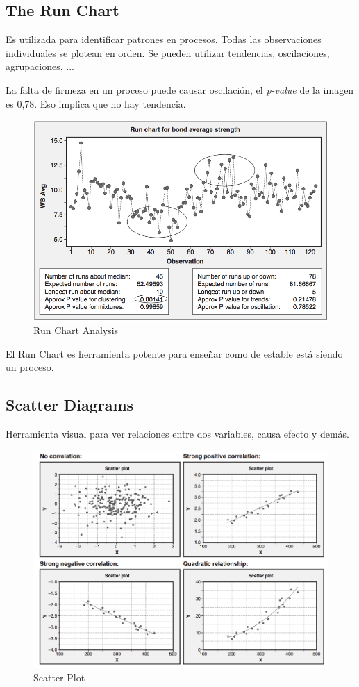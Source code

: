\documentclass[oneside]{book}
\begin{document}
\subsection{The Run Chart}

Es utilizada para identificar patrones en procesos. Todas las observaciones individuales se plotean en orden. Se pueden utilizar tendencias, oscilaciones, agrupaciones, ... 

La falta de firmeza en un proceso puede causar oscilación, el \textit{p-value} de la imagen es 0,78. Eso implica que no hay tendencia.

\begin{figure}[H]
	\centering
	\includegraphics[width=120mm]{imagenes/Run-Chart-Analysis.png}
	\caption{Run Chart Analysis}
	\label{fig:Run-Chart-Analysis}
\end{figure}

El Run Chart es herramienta potente para enseñar como de estable está siendo un proceso.

\subsection{Scatter Diagrams}

Herramienta visual para ver relaciones entre dos variables, causa efecto y demás. 

\begin{figure}[H]
	\centering
	\includegraphics[width=120mm]{imagenes/ScatterPlot.png}
	\caption{Scatter Plot}
	\label{fig:ScatterPlot}
\end{figure}
\end{document}
